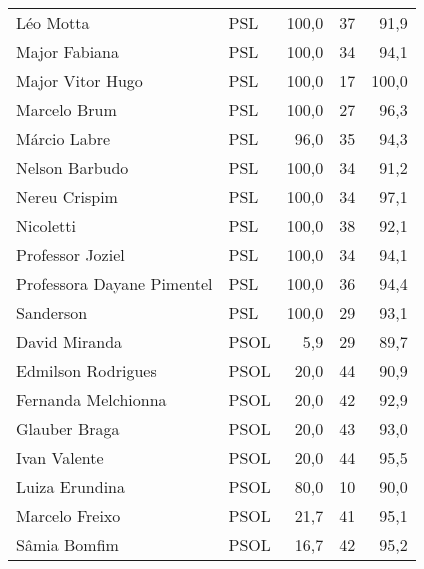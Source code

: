 \begin{longtable}{llrrr}
                           Léo Motta &            PSL &     100,0 &           37 &       91,9 \\
                       Major Fabiana &            PSL &     100,0 &           34 &       94,1 \\
                    Major Vitor Hugo &            PSL &     100,0 &           17 &      100,0 \\
                        Marcelo Brum &            PSL &     100,0 &           27 &       96,3 \\
                        Márcio Labre &            PSL &      96,0 &           35 &       94,3 \\
                      Nelson Barbudo &            PSL &     100,0 &           34 &       91,2 \\
                       Nereu Crispim &            PSL &     100,0 &           34 &       97,1 \\
                           Nicoletti &            PSL &     100,0 &           38 &       92,1 \\
                    Professor Joziel &            PSL &     100,0 &           34 &       94,1 \\
          Professora Dayane Pimentel &            PSL &     100,0 &           36 &       94,4 \\
                           Sanderson &            PSL &     100,0 &           29 &       93,1 \\
                       David Miranda &           PSOL &       5,9 &           29 &       89,7 \\
                  Edmilson Rodrigues &           PSOL &      20,0 &           44 &       90,9 \\
                 Fernanda Melchionna &           PSOL &      20,0 &           42 &       92,9 \\
                       Glauber Braga &           PSOL &      20,0 &           43 &       93,0 \\
                        Ivan Valente &           PSOL &      20,0 &           44 &       95,5 \\
                      Luiza Erundina &           PSOL &      80,0 &           10 &       90,0 \\
                      Marcelo Freixo &           PSOL &      21,7 &           41 &       95,1 \\
                        Sâmia Bomfim &           PSOL &      16,7 &           42 &       95,2 \\

\end{longtable}
